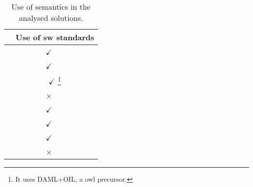 \begin{savenotes}
  \begin{table}[htbp]
    \caption{Use of semantics in the analysed solutions.}
    \centering
    \begin{tabular}{lc}
      \hline 
      & Use of \ac{sw} standards \\
      \hline 
      \midtsc{} & $\checkmark$~~~ \\
      \midsws{} & $\checkmark$~~~ \\
      \midstuples{} & $\checkmark$ \footnote{It uses DAML+OIL, a \ac{owl} precursor.} \\
      \midcspaces{} & ×~~~ \\
      \midtscpp{} & $\checkmark$~~~ \\
      \midtripcom{} & $\checkmark$~~~ \\
      \midsmartmt{} & $\checkmark$~~~ \\
      \midnardini{} & ×~~~ \\
      \hline 
    \end{tabular}
    \label{tab:semantics_comparison}
  \end{table}
\end{savenotes}

